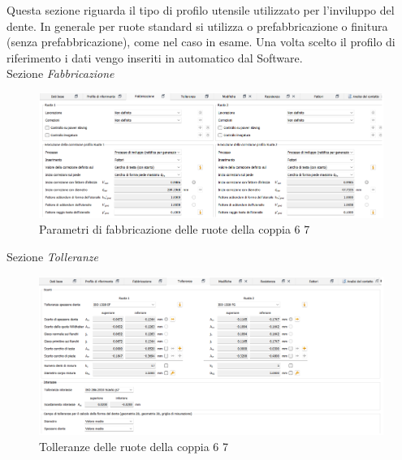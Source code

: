 Questa sezione riguarda il tipo di profilo utensile utilizzato per l’inviluppo del dente. 
In generale per ruote standard si utilizza o prefabbricazione o finitura (senza prefabbricazione), come nel caso in esame. Una volta scelto il profilo di riferimento i dati vengo inseriti in automatico dal Software.\\

Sezione \emph{Fabbricazione}
\begin{figure}[h]
    \centering
    \includegraphics[scale=0.5]{Immagini/FabbricazioneCoppia67.png}
    \caption{Parametri di fabbricazione delle ruote della coppia 6 7}
    \label{fig:FabbricazioneCoppia67}
\end{figure}
\newpage
Sezione \emph{Tolleranze}
\begin{figure}[h]
    \centering
    \includegraphics[scale=0.5]{Immagini/TolleranzeCoppia67.png}
    \caption{Tolleranze delle ruote della coppia 6 7}
    \label{fig:TolleranzeCoppia67}
\end{figure}

